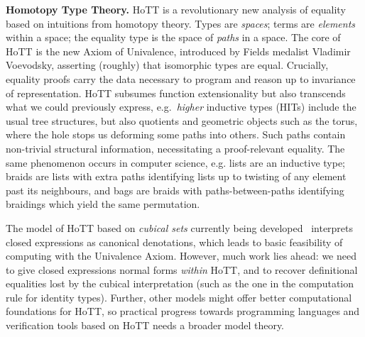 \documentclass[a4paper,11pt]{article}
\begin{document}



{\bf Homotopy Type Theory.} HoTT is a revolutionary new analysis of
equality based on intuitions from homotopy theory. Types are
\emph{spaces}; terms are \emph{elements} within a space; the equality
type is the space of \emph{paths} in a space. The core of HoTT is the
new Axiom of Univalence, introduced by Fields medalist Vladimir
Voevodsky, asserting (roughly) that isomorphic types are
equal. Crucially, equality proofs carry the data necessary to program
and reason up to invariance of representation. HoTT subsumes function
extensionality but also transcends what we could previously express,
e.g.\ \emph{higher} inductive types (HITs) include the usual tree
structures, but also quotients \cite{alti:mpc04} and geometric objects such as the
torus, where the hole stops us deforming some paths into others. Such
paths contain non-trivial structural information, necessitating a
proof-relevant equality. The same phenomenon occurs in computer
science, e.g. lists are an inductive type; braids are lists with extra
paths identifying lists up to twisting of any element past its
neighbours, and bags are braids with paths-between-paths identifying
braidings which yield the same permutation.

The model of HoTT based on \emph{cubical sets} currently being developed~\cite{BezemM:cubsmt} interprets closed expressions
as canonical denotations, which leads to basic feasibility of computing
with the Univalence Axiom. However, much work lies ahead: we need to give
closed expressions normal forms \emph{within} HoTT, and to recover
definitional equalities lost by the cubical interpretation (such as the one in the
computation rule for identity types). Further, other models might
offer better computational foundations for HoTT, so practical progress
towards programming languages and verification tools based on HoTT
needs a broader model theory.



\end{document}
